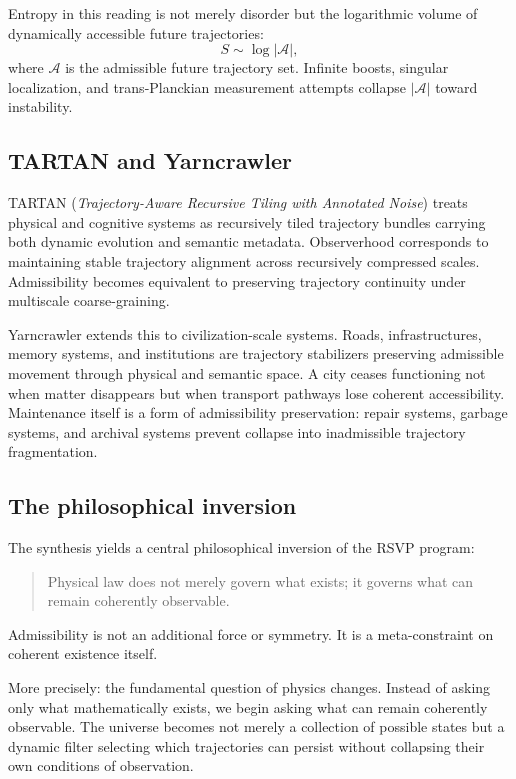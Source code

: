 \documentclass[12pt, a4paper]{article}
\theoremstyle{plain}
\theoremstyle{definition}
\theoremstyle{remark}
\begin{document}
Entropy in this reading is not merely disorder but the logarithmic
volume of dynamically accessible future trajectories:
\[
  S \sim \log |\mathcal{A}|,
\]
where $\mathcal{A}$ is the admissible future trajectory set.
Infinite boosts, singular localization, and trans-Planckian measurement
attempts collapse $|\mathcal{A}|$ toward instability.

\subsection{TARTAN and Yarncrawler}

TARTAN (\emph{Trajectory-Aware Recursive Tiling with Annotated Noise})
treats physical and cognitive systems as recursively tiled trajectory
bundles carrying both dynamic evolution and semantic metadata.
Observerhood corresponds to maintaining stable trajectory alignment
across recursively compressed scales.
Admissibility becomes equivalent to preserving trajectory continuity
under multiscale coarse-graining.

Yarncrawler extends this to civilization-scale systems.
Roads, infrastructures, memory systems, and institutions are
trajectory stabilizers preserving admissible movement through physical
and semantic space.
A city ceases functioning not when matter disappears but when transport
pathways lose coherent accessibility.
Maintenance itself is a form of admissibility preservation:
repair systems, garbage systems, and archival systems prevent collapse
into inadmissible trajectory fragmentation.

\subsection{The philosophical inversion}

The synthesis yields a central philosophical inversion of the RSVP
program:
\begin{quote}
  Physical law does not merely govern what exists;
  it governs what can remain coherently observable.
\end{quote}

Admissibility is not an additional force or symmetry.
It is a meta-constraint on coherent existence itself.

More precisely: the fundamental question of physics changes.
Instead of asking only what mathematically exists, we begin asking
what can remain coherently observable.
The universe becomes not merely a collection of possible states but a
dynamic filter selecting which trajectories can persist without
collapsing their own conditions of observation.
\end{document}
